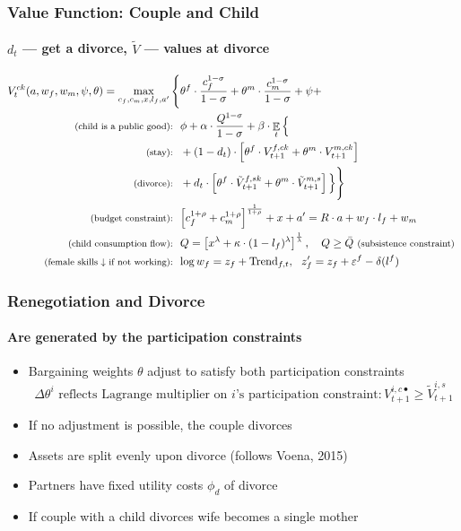 \documentclass[aspectratio=169]{beamer}
\DeclareMathOperator{\E}{\mathbb{E}}
\let\olditem\item
\renewcommand{\item}{%
\olditem\vspace{\fill}}
\begin{document}
\begin{frame}
\frametitle{Value Function: Couple and Child}
\framesubtitle{$d_t$ --- get a divorce, $\tilde{V}$ --- values at divorce}
\begin{align*}
V^{ck}_t(a,w_f,w_m,\psi,\theta) = \max\limits_{c_f,c_m,x,l_f,a'} \Bigg\{ & \theta^f \cdot \frac{c_f^{1-\sigma}}{{1-\sigma}}  + \theta^m \cdot \frac{c_m^{1-\sigma}}{1-\sigma}  + \psi + \\ \text{ \footnotesize (child is a public good): \ }  & \phi + \alpha \cdot \frac{Q^{1-\sigma}}{1-\sigma} +  \beta \cdot \E_t \Big\{   \\
\text{ \footnotesize (stay): \ } & + (1-d_t) \cdot  \left[ \theta^f \cdot  V^{f,ck}_{t+1} + \theta^m \cdot V^{m,ck}_{t+1}  \right] \\
\text{ \footnotesize (divorce): \ } & + d_t \cdot \left[ \theta^f \cdot  \tilde V^{f,sk}_{t+1} + \theta^m \cdot \tilde V^{m,s}_{t+1}  \right]  \Big\} \Bigg\}\\
\text{ \footnotesize (budget constraint): \ } &{\normalsize \left[c_f^{1+\rho} + c_m^{1+\rho}\right]^{\frac1{1+\rho}} + x + a' = R\cdot a + w_f\cdot l_f + w_m}\\
\text{ \footnotesize (child consumption flow): \ } &{\normalsize Q = \left[x^\lambda + \kappa \cdot (1-l_f)^\lambda\right]^{\frac1\lambda}, \ \ \ Q\geq \bar{Q}} \text{ \footnotesize  (subsistence constraint) } \\
\text{ \footnotesize (female skills $\downarrow$ if not working): \ } &{\normalsize \log w_f = z_f + \text{Trend}_{f,t}, \ \ z'_f = z_f + \varepsilon^f - \delta(l^f)}\\
\end{align*}
\end{frame}



\begin{frame}
\frametitle{Renegotiation and Divorce}
\framesubtitle{Are generated by the participation constraints}
\begin{itemize}
\item Bargaining weights $\theta$ adjust to satisfy both participation constraints
\[\Delta \theta^i \text{ reflects Lagrange multiplier on $i$'s participation constraint}: V^{i,c\bullet}_{t+1} \geq \tilde{V}^{i,s}_{t+1}\]
\item If no adjustment is possible, the couple divorces
\item Assets are split evenly upon divorce (follows Voena, 2015)
\item Partners have fixed utility costs $\phi_d$ of divorce
\item If couple with a child divorces wife becomes a single mother
\end{itemize}
\end{frame}
\end{document}
